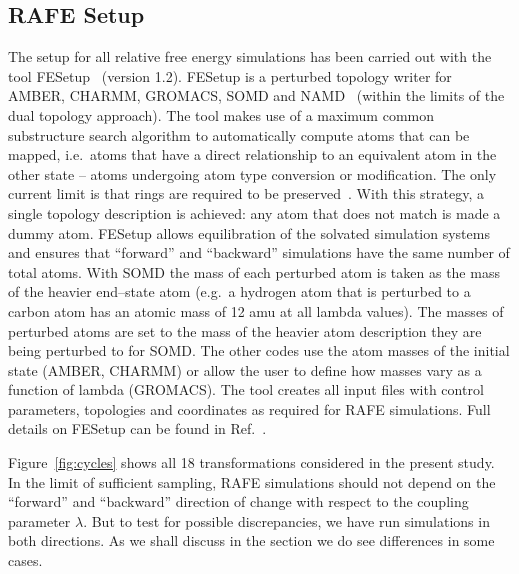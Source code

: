 \documentclass[journal=jctcce,manuscript=article]{achemso}
\begin{document}
\subsection{RAFE Setup}
\label{sec:rafe_setup}

The setup for all relative free energy simulations has been carried
out with the tool FESetup~\cite{loeffler_fesetup:_2015} (version
1.2).  FESetup is a perturbed topology writer for AMBER, CHARMM,
GROMACS, SOMD and NAMD~\cite{JCC:JCC20289} (within the
limits of the dual topology approach).  The tool makes use of a
maximum common substructure search algorithm to automatically compute
atoms that can be mapped, i.e.\ atoms that have a direct relationship
to an equivalent atom in the other state -- atoms undergoing atom type conversion or modification.  The only current limit is that rings are
required to be preserved~\cite{doi:10.1021/acs.jcim.5b00057}.  With this
strategy, a single topology description is achieved: any atom that
does not match is made a dummy atom.  FESetup allows
equilibration of the solvated simulation systems and ensures that
``forward'' and ``backward'' simulations have the same number of
total atoms.  With SOMD the mass of each perturbed atom is taken as the mass of the heavier end--state atom (e.g.\ a hydrogen atom that is perturbed to a carbon atom has an atomic mass of 12 amu at all lambda values).  The masses of perturbed atoms are set to the mass of the heavier atom description they are being perturbed to for SOMD.  The other codes use the atom masses of the initial state (AMBER, CHARMM) or allow the user to define how masses vary as a function of lambda (GROMACS).
The tool creates all input files with control
parameters, topologies and coordinates as required for RAFE
simulations.  Full details on FESetup can be found in
Ref.~.

Figure~\ref{fig:cycles} shows all 18 transformations considered in the present study.
In the limit of sufficient sampling, RAFE simulations should not depend on the ``forward'' and ``backward'' direction of change with respect to the coupling
parameter $\lambda$.  But to test for possible discrepancies, we have run
simulations in both directions.  As we shall discuss in the
 section we do see differences in some cases.
\end{document}
